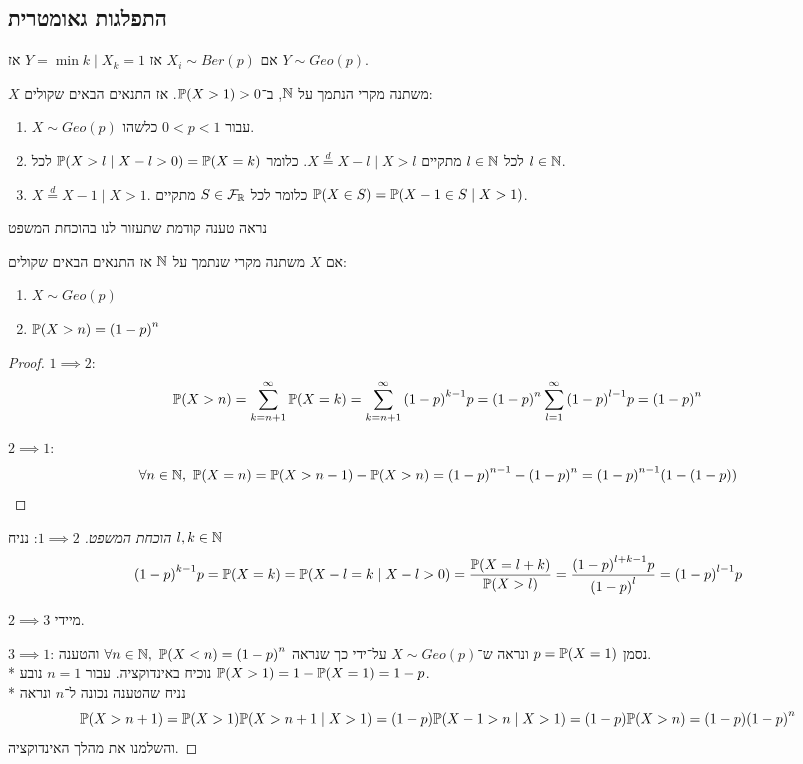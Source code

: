 \subsection{התפלגות גאומטרית}
\begin{proposition}
	אם $X_i \sim Ber(p)$ אז $Y = \min{k \mid X_k = 1}$ אז $Y \sim Geo(p)$.
\end{proposition}
\begin{theorem}
	$X$ משתנה מקרי הנתמך על $\mathbb{N}$, ב־$\mathbb{P}(X > 1) > 0$.
	אז התנאים הבאים שקולים:
	\begin{enumerate}
		\item $X \sim Geo(p)$ עבור $0 < p < 1$ כלשהו.
		\item לכל $l \in \mathbb{N}$ מתקיים $X \overset{d}{=} X - l \mid X > l$. כלומר $\mathbb{P}(X > l \mid X - l > 0) = \mathbb{P}(X = k)$ לכל $l \in \mathbb{N}$.
		\item $X \overset{d}{=} X - 1 \mid X > 1$. כלומר לכל $S \in \mathcal{F}_{\mathbb{R}}$ מתקיים $\mathbb{P}(X \in S) = \mathbb{P}(X - 1 \in S \mid X > 1)$.
	\end{enumerate}
\end{theorem}
נראה טענה קודמת שתעזור לנו בהוכחת המשפט
\begin{proposition}
	אם $X$ משתנה מקרי שנתמך על $\mathbb{N}$ אז התנאים הבאים שקולים:
	\begin{enumerate}
		\item $X \sim Geo(p)$
		\item $\mathbb{P}(X > n) = {(1 - p)}^n$
	\end{enumerate}
\end{proposition}
\begin{proof}
	$1 \implies 2$:
	\[
		\mathbb{P}(X > n)
		= \sum_{k = n + 1}^{\infty} \mathbb{P}(X = k)
		= \sum_{k = n + 1}^{\infty} {(1 - p)}^{k - 1} p
		= {(1 - p)}^n \sum_{l = 1}^{\infty} {(1 - p)}^{l - 1} p
		= {(1 - p)}^n
	\]

	$2 \implies 1$:
	\[
		\forall n \in \mathbb{N},\ \mathbb{P}(X = n)
		= \mathbb{P}(X > n - 1) - \mathbb{P}(X > n)
		= {(1 - p)}^{n - 1} - {(1 - p)}^n
		= {(1 - p)}^{n - 1} (1 - (1 - p))
	\]
\end{proof}
\begin{proof}[הוכחת המשפט]
	$1 \implies 2$:
	נניח $l, k \in \mathbb{N}$
	\[
		{(1 - p)}^{k - 1} p
		= \mathbb{P}(X = k)
		= \mathbb{P}(X - l = k \mid X - l > 0)
		= \frac{\mathbb{P}(X = l + k)}{\mathbb{P}(X > l)}
		= \frac{{(1 - p)}^{l + k - 1} p}{{(1 - p)}^l}
		= {(1 - p)}^{l - 1} p
	\]

	$2 \implies 3$ מיידי.

	$3 \implies 1$:
	נסמן $p = \mathbb{P}(X = 1)$ ונראה ש־$X \sim Geo(p)$ על־ידי כך שנראה $\forall n \in \mathbb{N},\ \mathbb{P}(X < n) = {(1 - p)}^n$ והטענה. \\*
	נוכיח באינדוקציה. עבור $n = 1$ נובע $\mathbb{P}(X > 1) = 1 - \mathbb{P}(X = 1) = 1 - p$. \\*
	נניח שהטענה נכונה ל־$n$ ונראה
	\[
		\mathbb{P}(X > n + 1)
		= \mathbb{P}(X > 1) \mathbb{P}(X > n + 1 \mid X > 1)
		= (1 - p) \mathbb{P}(X - 1 > n \mid X > 1)
		= (1 - p) \mathbb{P}(X > n)
		= (1 - p) {(1 - p)}^n
	\]
	והשלמנו את מהלך האינדוקציה.
\end{proof}

